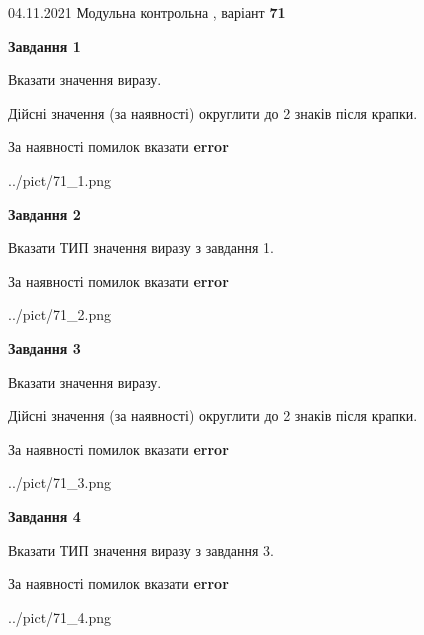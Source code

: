 \documentclass[11pt, ukrainian]{article}
\begin{document}
{04.11.2021 Модульна контрольна , варіант  \No \textbf { 71 }\par}
{
\begin {large}
{\begin {center}\textbf{Завдання 1}\end {center}}\par
Вказати значення виразу. \par
Дійсні значення (за наявності) округлити до 2 знаків після крапки. \par
За наявності помилок вказати \textbf{error}

\begin{center}
	{../pict/71_1.png}
\end{center}
\newpage

{\begin {center}\textbf{Завдання 2}\end {center}}\par
Вказати ТИП значення виразу з завдання 1. \par
За наявності помилок вказати \textbf{error}

\begin{center}
	{../pict/71_2.png}
\end{center}
\newpage

{\begin {center}\textbf{Завдання 3}\end {center}}\par
Вказати значення виразу. \par
Дійсні значення (за наявності) округлити до 2 знаків після крапки. \par
За наявності помилок вказати \textbf{error}

\begin{center}
	{../pict/71_3.png}
\end{center}
\newpage

{\begin {center}\textbf{Завдання 4}\end {center}}\par
Вказати ТИП значення виразу з завдання 3. \par
За наявності помилок вказати \textbf{error}

\begin{center}
	{../pict/71_4.png}
\end{center}
\newpage


\end{large}}
\end{document}

